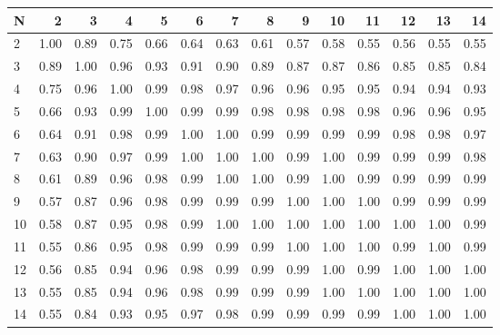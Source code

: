 \begin{tabular}{lrrrrrrrrrrrrr}
\toprule
N &    2  &    3  &    4  &    5  &    6  &    7  &    8  &    9  &    10 &    11 &    12 &    13 &    14 \\
\midrule
2  &  1.00 &  0.89 &  0.75 &  0.66 &  0.64 &  0.63 &  0.61 &  0.57 &  0.58 &  0.55 &  0.56 &  0.55 &  0.55 \\
3  &  0.89 &  1.00 &  0.96 &  0.93 &  0.91 &  0.90 &  0.89 &  0.87 &  0.87 &  0.86 &  0.85 &  0.85 &  0.84 \\
4  &  0.75 &  0.96 &  1.00 &  0.99 &  0.98 &  0.97 &  0.96 &  0.96 &  0.95 &  0.95 &  0.94 &  0.94 &  0.93 \\
5  &  0.66 &  0.93 &  0.99 &  1.00 &  0.99 &  0.99 &  0.98 &  0.98 &  0.98 &  0.98 &  0.96 &  0.96 &  0.95 \\
6  &  0.64 &  0.91 &  0.98 &  0.99 &  1.00 &  1.00 &  0.99 &  0.99 &  0.99 &  0.99 &  0.98 &  0.98 &  0.97 \\
7  &  0.63 &  0.90 &  0.97 &  0.99 &  1.00 &  1.00 &  1.00 &  0.99 &  1.00 &  0.99 &  0.99 &  0.99 &  0.98 \\
8  &  0.61 &  0.89 &  0.96 &  0.98 &  0.99 &  1.00 &  1.00 &  0.99 &  1.00 &  0.99 &  0.99 &  0.99 &  0.99 \\
9  &  0.57 &  0.87 &  0.96 &  0.98 &  0.99 &  0.99 &  0.99 &  1.00 &  1.00 &  1.00 &  0.99 &  0.99 &  0.99 \\
10 &  0.58 &  0.87 &  0.95 &  0.98 &  0.99 &  1.00 &  1.00 &  1.00 &  1.00 &  1.00 &  1.00 &  1.00 &  0.99 \\
11 &  0.55 &  0.86 &  0.95 &  0.98 &  0.99 &  0.99 &  0.99 &  1.00 &  1.00 &  1.00 &  0.99 &  1.00 &  0.99 \\
12 &  0.56 &  0.85 &  0.94 &  0.96 &  0.98 &  0.99 &  0.99 &  0.99 &  1.00 &  0.99 &  1.00 &  1.00 &  1.00 \\
13 &  0.55 &  0.85 &  0.94 &  0.96 &  0.98 &  0.99 &  0.99 &  0.99 &  1.00 &  1.00 &  1.00 &  1.00 &  1.00 \\
14 &  0.55 &  0.84 &  0.93 &  0.95 &  0.97 &  0.98 &  0.99 &  0.99 &  0.99 &  0.99 &  1.00 &  1.00 &  1.00 \\
\bottomrule
\end{tabular}
